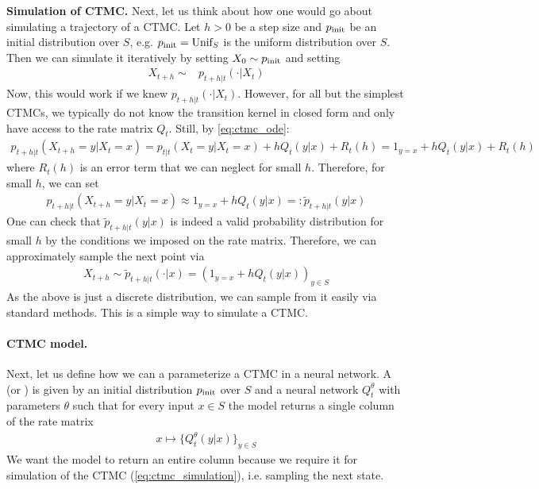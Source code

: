 \textbf{Simulation of CTMC.} Next, let us think about how one would go about simulating a trajectory of a CTMC. Let $h>0$ be a step size and $p_{\rm{init}}$ be an initial distribution over $S$, e.g. $p_{\rm{init}}=\text{Unif}_{S}$ is the uniform distribution over $S$. Then we can simulate it iteratively by setting $X_0\sim p_{\rm{init}}$ and setting
\begin{align*}
X_{t+h}\sim &p_{t+h|t}(\cdot|X_t)
\end{align*}
Now, this would work if we knew $p_{t+h|t}(\cdot|X_t)$. However, for all but the simplest CTMCs, we typically do not know the transition kernel in closed form and only have access to the rate matrix $Q_t$. Still, by \cref{eq:ctmc_ode}:
\begin{align*}
  p_{t+h|t}(X_{t+h}=y|X_t=x)
=p_{t|t}(X_{t}=y|X_t=x)+hQ_t(y|x)+R_{t}(h)=1_{y=x}+hQ_t(y|x)+R_t(h)
\end{align*}
where $R_t(h)$ is an error term that we can neglect for small $h$. Therefore, for small $h$, we can set
\begin{align*}
p_{t+h|t}(X_{t+h}=y|X_t=x)\approx 1_{y=x}+hQ_t(y|x)=:\tilde{p}_{t+h|t}(y|x)
\end{align*}
One can check that $\tilde{p}_{t+h|t}(y|x)$ is indeed a valid probability distribution for small $h$ by the conditions we imposed on the rate matrix. Therefore, we can approximately sample the next point via
\begin{align}
\label{eq:ctmc_simulation}
X_{t+h}\sim \tilde{p}_{t+h|t}(\cdot|x)=(1_{y=x}+hQ_t(y|x))_{y\in S}
\end{align}
As the above is just a discrete distribution, we can sample from it easily via standard methods. This is a simple way to simulate a CTMC.

\paragraph{CTMC model.} Next, let us define how we can a parameterize a CTMC in a neural network. A  (or ) is given by an initial distribution $p_{\rm{init}}$ over $S$ and a neural network $Q_t^\theta$ with parameters $\theta$ such that for every input $x\in S$ the model returns a single column of the rate matrix
\begin{align*}
    x\mapsto \{Q_t^\theta(y|x)\}_{y\in S}
\end{align*}
We want the model to return an entire column because we require it for simulation of the CTMC (\cref{eq:ctmc_simulation}), i.e. sampling the next state.

